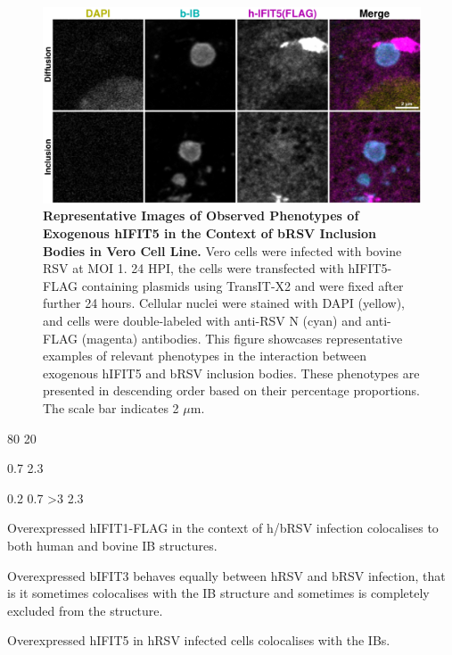 \begin{figure}
    \centering
    \includegraphics[width=1\linewidth]{09. Chapter 4/Figs/02. Overexpression/04. IFIT5/06. i5-brsv.pdf}
    \caption[Representative Images of Observed Phenotypes of Exogenous hIFIT5 in the Context of bRSV Inclusion Bodies in Vero Cell Line.]{\textbf{Representative Images of Observed Phenotypes of Exogenous hIFIT5 in the Context of bRSV Inclusion Bodies in Vero Cell Line.} Vero cells were infected with bovine RSV at MOI 1. 24 HPI, the cells were transfected with hIFIT5-FLAG containing plasmids using TransIT-X2 and were fixed after further 24 hours. Cellular nuclei were stained with DAPI (yellow), and cells were double-labeled with anti-RSV N (cyan) and anti-FLAG (magenta) antibodies. This figure showcases representative examples of relevant phenotypes in the interaction between exogenous hIFIT5 and bRSV inclusion bodies. These phenotypes are presented in descending order based on their percentage proportions. The scale bar indicates 2 \(\mu \mbox{m}\).}
    \label{fig:Representative Images of Observed Phenotypes of Exogenous hIFIT5 in the Context of bRSV Inclusion Bodies in VERO Cell Line}
\end{figure}

80 20

0.7 2.3

0.2 0.7 >3
2.3

Overexpressed hIFIT1-FLAG in the context of h/bRSV infection colocalises to both human and bovine IB structures.

Overexpressed bIFIT3 behaves equally between hRSV and bRSV infection, that is it sometimes colocalises with the IB structure and sometimes is completely excluded from the structure.

Overexpressed hIFIT5 in hRSV infected cells colocalises with the IBs.